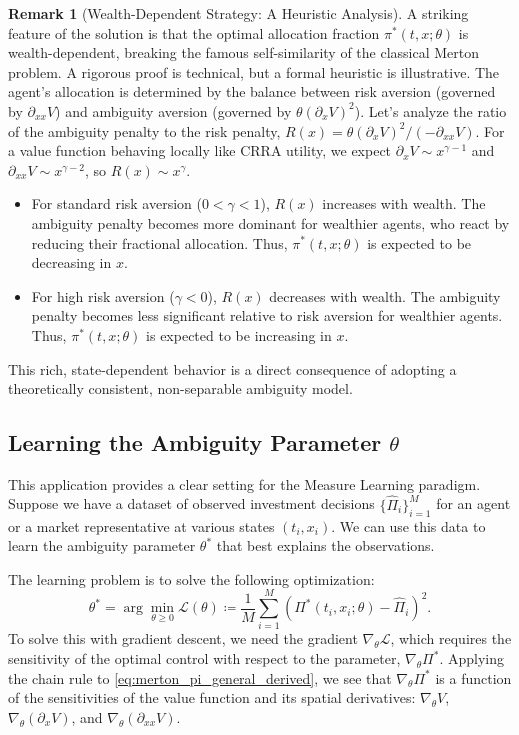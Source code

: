 \documentclass[qian]{imsart}
\theoremstyle{plain}
\theoremstyle{definition}
\newtheorem{remark}[theorem]{Remark}
\begin{document}
\begin{remark}[Wealth-Dependent Strategy: A Heuristic Analysis]
\label{rem:wealth_dependence_heuristic}
A striking feature of the solution is that the optimal allocation fraction $\pi^*(t,x; \theta)$ is wealth-dependent, breaking the famous self-similarity of the classical Merton problem. A rigorous proof is technical, but a formal heuristic is illustrative. The agent's allocation is determined by the balance between risk aversion (governed by $\partial_{xx}V$) and ambiguity aversion (governed by $\theta(\partial_xV)^2$). Let's analyze the ratio of the ambiguity penalty to the risk penalty, $R(x) = \theta(\partial_xV)^2 / (-\partial_{xx}V)$. For a value function behaving locally like CRRA utility, we expect $\partial_x V \sim x^{\gamma-1}$ and $\partial_{xx}V \sim x^{\gamma-2}$, so $R(x) \sim x^\gamma$.
\begin{itemize}
    \item For standard risk aversion ($0 < \gamma < 1$), $R(x)$ increases with wealth. The ambiguity penalty becomes more dominant for wealthier agents, who react by reducing their fractional allocation. Thus, $\pi^*(t,x; \theta)$ is expected to be decreasing in $x$.
    \item For high risk aversion ($\gamma < 0$), $R(x)$ decreases with wealth. The ambiguity penalty becomes less significant relative to risk aversion for wealthier agents. Thus, $\pi^*(t,x; \theta)$ is expected to be increasing in $x$.
\end{itemize}
This rich, state-dependent behavior is a direct consequence of adopting a theoretically consistent, non-separable ambiguity model.
\end{remark}

\subsection{Learning the Ambiguity Parameter \texorpdfstring{$\theta$}{theta}}

This application provides a clear setting for the Measure Learning paradigm. Suppose we have a dataset of observed investment decisions $\{\hat{\Pi}_i\}_{i=1}^M$ for an agent or a market representative at various states $(t_i, x_i)$. We can use this data to learn the ambiguity parameter $\theta^*$ that best explains the observations.

The learning problem is to solve the following optimization:
\begin{equation}
    \theta^* = \arg\min_{\theta \ge 0} \mathcal{L}(\theta) \coloneqq \frac{1}{M}\sum_{i=1}^M \left( \Pi^*(t_i, x_i; \theta) - \hat{\Pi}_i \right)^2.
\end{equation}
To solve this with gradient descent, we need the gradient $\nabla_\theta \mathcal{L}$, which requires the sensitivity of the optimal control with respect to the parameter, $\nabla_\theta \Pi^*$. Applying the chain rule to \eqref{eq:merton_pi_general_derived}, we see that $\nabla_\theta \Pi^*$ is a function of the sensitivities of the value function and its spatial derivatives: $\nabla_\theta V$, $\nabla_\theta (\partial_x V)$, and $\nabla_\theta (\partial_{xx} V)$.
\end{document}
